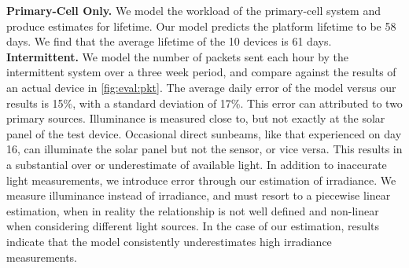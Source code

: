 \vspace{-6pt}
\noindent
\textbf{Primary-Cell Only.}
We model the workload of the primary-cell system and produce estimates for
lifetime.  Our model predicts the platform lifetime
to be 58 days.  We find that the average lifetime of the 10 devices is 61 days.
\\

\vspace{-6pt}
\noindent
\textbf{Intermittent.}
We model the number of packets sent each hour by the
intermittent system over a three week period, and compare against the results of an actual device in
\cref{fig:eval:pkt}.
The average daily error of the model versus our results is 15\%, with a standard deviation of
17\%. This error can attributed to two primary sources. Illuminance is measured
close to, but not exactly at the solar panel of the test device. Occasional
direct sunbeams, like that experienced on day 16, can illuminate the solar
panel but not the sensor, or vice versa. This
results in a substantial over or underestimate of available light. In addition
to inaccurate light measurements, we introduce error through our estimation of
irradiance. We measure illuminance
instead of irradiance, and must resort to a piecewise linear estimation, when
in reality the relationship is not well defined and non-linear when considering
different light sources. In the case of our estimation, results
indicate that the model consistently underestimates high irradiance measurements.\\

